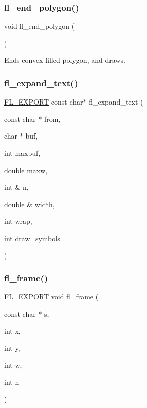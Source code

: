 \subsubsection{\texorpdfstring{fl\+\_\+end\+\_\+polygon()}{fl\_end\_polygon()}}
{\footnotesize\ttfamily void fl\+\_\+end\+\_\+polygon (\begin{DoxyParamCaption}{ }\end{DoxyParamCaption})\hspace{0.3cm}{\ttfamily [inline]}}

Ends convex filled polygon, and draws. \mbox{\label{group__fl__drawings_ga9e893bce710f855228890cfb3026b953}} 
\subsubsection{\texorpdfstring{fl\+\_\+expand\+\_\+text()}{fl\_expand\_text()}}
{\footnotesize\ttfamily \hyperlink{_fl___export_8_h_aa9ba29a18aee9d738370a06eeb4470fc}{F\+L\+\_\+\+E\+X\+P\+O\+RT} const char$\ast$ fl\+\_\+expand\+\_\+text (\begin{DoxyParamCaption}\item[{const char $\ast$}]{from,  }\item[{char $\ast$}]{buf,  }\item[{int}]{maxbuf,  }\item[{double}]{maxw,  }\item[{int \&}]{n,  }\item[{double \&}]{width,  }\item[{int}]{wrap,  }\item[{int}]{draw\+\_\+symbols = {} }\end{DoxyParamCaption})}

\mbox{\label{group__fl__drawings_ga2e109cb030c3f2fbef45156c687b8138}} 
\subsubsection{\texorpdfstring{fl\+\_\+frame()}{fl\_frame()}}
{\footnotesize\ttfamily \hyperlink{_fl___export_8_h_aa9ba29a18aee9d738370a06eeb4470fc}{F\+L\+\_\+\+E\+X\+P\+O\+RT} void fl\+\_\+frame (\begin{DoxyParamCaption}\item[{const char $\ast$}]{s,  }\item[{int}]{x,  }\item[{int}]{y,  }\item[{int}]{w,  }\item[{int}]{h }\end{DoxyParamCaption})}

